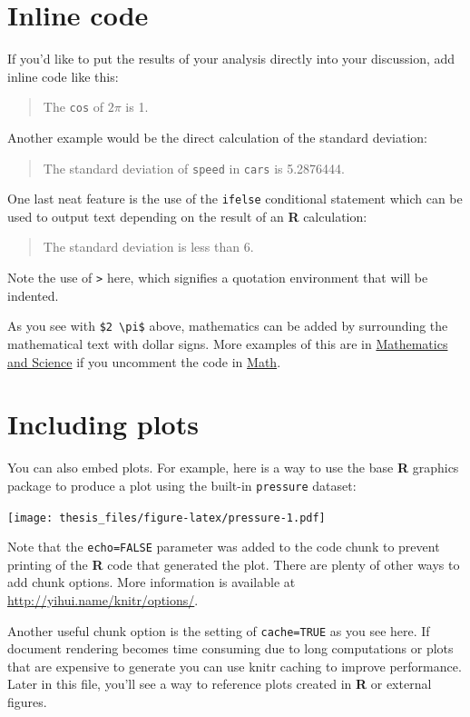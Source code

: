\documentclass [11pt, proquest] {uwthesis}[2015/03/03]
\begin{document}
\section{Inline code}\label{inline-code}

If you'd like to put the results of your analysis directly into your
discussion, add inline code like this:
\begin{quote}
The \texttt{cos} of \(2 \pi\) is 1.
\end{quote}
Another example would be the direct calculation of the standard
deviation:
\begin{quote}
The standard deviation of \texttt{speed} in \texttt{cars} is 5.2876444.
\end{quote}
One last neat feature is the use of the \texttt{ifelse} conditional
statement which can be used to output text depending on the result of an
\textbf{R} calculation:
\begin{quote}
The standard deviation is less than 6.
\end{quote}
Note the use of \texttt{\textgreater{}} here, which signifies a
quotation environment that will be indented.

As you see with \texttt{\$2\ \textbackslash{}pi\$} above, mathematics
can be added by surrounding the mathematical text with dollar signs.
More examples of this are in \protect\hyperlink{math-sci}{Mathematics
and Science} if you uncomment the code in
\protect\hyperlink{math}{Math}.

\section{Including plots}\label{including-plots}

You can also embed plots. For example, here is a way to use the base
\textbf{R} graphics package to produce a plot using the built-in
\texttt{pressure} dataset:

\texttt{[image: thesis\_files/figure-latex/pressure-1.pdf]}

Note that the \texttt{echo=FALSE} parameter was added to the code chunk
to prevent printing of the \textbf{R} code that generated the plot.
There are plenty of other ways to add chunk options. More information is
available at \url{http://yihui.name/knitr/options/}.

Another useful chunk option is the setting of \texttt{cache=TRUE} as you
see here. If document rendering becomes time consuming due to long
computations or plots that are expensive to generate you can use knitr
caching to improve performance. Later in this file, you'll see a way to
reference plots created in \textbf{R} or external figures.
\end{document}
